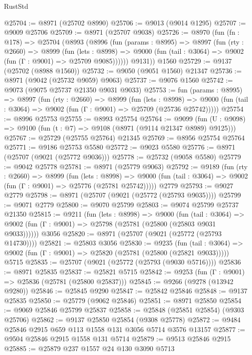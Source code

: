 \begin{lexlean}{RustStd}
\begin{coremodule}
@25704 := @8971 (@25702 @8990)
@25706 := @9013 (@9014 @1295)
@25707 := @9009 @25706
@25709 := @8971 (@25707 @9038)
@25726 := @8970
    (fun (fn : @178) =>
    @25704
      (@8993
        (@8996
          (fun (params : @8995) =>
          @8997
            (fun (rty : @2660) =>
            @8999
              (fun (lets : @8998) =>
              @9000 (fun (tail : @3064) => @9002 (fun (Γ : @9001) => @25709 @9085))))))
        @9131))
    @1560
@25729 := @9137 (@25702 (@8988 @1560))
@25732 := @9050 (@9051 @1560) @21347
@25736 := @8971 (@9042 (@25732 @9059) @9063)
@25737 := @9076 @1560
@25742 := @9073 (@9075 @25737 @21350 @9031 @9033)
@25753 := fun (params : @8995) =>
  @8997
    (fun (rty : @2660) =>
    @8999
      (fun (lets : @8998) =>
      @9000 (fun (tail : @3064) => @9002 (fun (Γ : @9001) => @25709 (@25736 @25742)))))
@25754 := @8996 @25753
@25755 := @8993 @25754
@25764 := @9099
    (fun (U : @9098) => @9100 (fun (t : @7) => @9108 (@8971 (@9114 @21347 @8989) @9125)))
@25767 := @25729 (@25755 @25764) @21345
@25769 := @8956 @25754 @25764
@25771 := @9186 @25753 @5580
@25772 := @9023 @5580
@25776 := @8971 (@25707 (@9021 (@25772 @9036)))
@25778 := @25732 (@9058 @5580)
@25779 := @9042 @25778
@25781 := @8971 (@25779 @9063)
@25792 := @9189
    (fun (rty : @2660) =>
    @8999
      (fun (lets : @8998) =>
      @9000 (fun (tail : @3064) => @9002 (fun (Γ : @9001) => @25776 (@25781 @25742)))))
    @2779
@25793 := @9027 @2779
@25798 := @8971 (@25707 (@9021 (@25772 (@25793 @9035))))
@25799 := @9071 @2779
@25800 := @9070 @25799
@25803 := @9074 @25799 @25737 @21350
@25815 := @9211
    (fun (lets : @8998) =>
    @9000
      (fun (tail : @3064) =>
      @9002 (fun (Γ : @9001) => @25798 (@25781 (@25800 (@25803 @9031 @9033))))))
    @3056
@25820 := @8971 (@25707 (@9021 (@25772 (@25793 @14730))))
@25821 := @25803 @3056
@25830 := @9235
    (fun (tail : @3064) => @9002 (fun (Γ : @9001) => @25820 (@25781 (@25800 (@25821 @9033)))))
    @5715
@25835 := @25707 (@9021 (@25772 (@25793 (@9030 @5716))))
@25836 := @8971 @25835
@25837 := @25821 @5715
@25842 := @9253 (fun (Γ : @9001) => @25836 (@25781 (@25800 @25837)))
@25845 := @9266 (@9278 (@13942 @9280))
@25846 := @25845 @9290
@25847 := @25842 @25846
@25848 := @9137 @25835
@25850 := @25779 (@9062 @25846)
@25851 := @8971 @25850
@25854 := @9069 @25846 @25799 @25837
@25858 := @25848 (@25851 @25854) (@9303 @25706)
@25862 := @9137 @25850 @25854 (@9308 @25778)
@25872 := @9484 @25846 @2915 @659 @113 @1558 @131 @3056 @5714 @3576 @13157
@25877 := @9504 @25846 @2915 @1558 @131 @5714
@25879 := @9513 @25846 @2915
@25885 := @25879 @237 @1557 @24 @130 @3090 @5713

\end{coremodule}
\end{lexlean}
